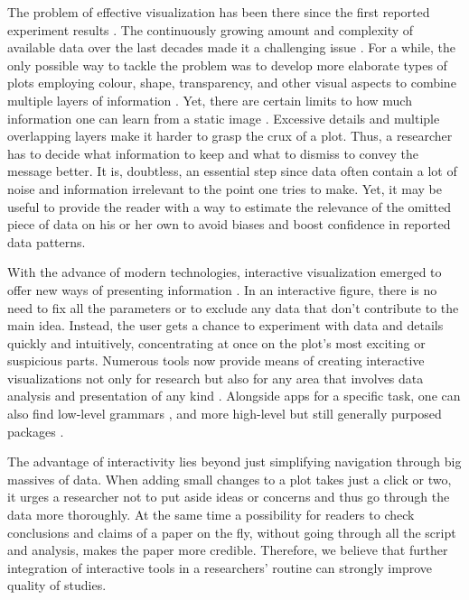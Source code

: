 \documentclass[twocolumn,10pt]{article}
\begin{document}
The problem of effective visualization has been there since the first reported experiment results \citep{friendly_2001}. The continuously growing amount and complexity of available data over the last decades made it a challenging issue \citep{fisher_2017}. For a while, the only possible way to tackle the problem was to develop more elaborate types of plots employing colour, shape, transparency, and other visual aspects to combine multiple layers of information \citep{keahey_2013, bertin_2011, heer_2009}. Yet, there are certain limits to how much information one can learn from a static image \citep{hegarty_2011}. Excessive details and multiple overlapping layers make it harder to grasp the crux of a plot. Thus, a researcher has to decide what information to keep and what to dismiss to convey the message better\citep{odonoghue_2018}. 
It is, doubtless, an essential step since data often contain a lot of noise and information irrelevant to the point one tries to make. Yet, it may be useful to provide the reader with a way to estimate the relevance of the omitted piece of data on his or her own to avoid biases \citep{bresciani_2009} and boost confidence in reported data patterns.

With the advance of modern technologies, interactive visualization emerged to offer new ways of presenting information \citep{newman_1979, becker_1987}. In an interactive figure, there is no need to fix all the parameters or to exclude any data that don't contribute to the main idea. Instead, the user gets a chance to experiment with data and details quickly and intuitively, concentrating at once on the plot's most exciting or suspicious parts. Numerous tools \citep{caldarola_2017} now provide means of creating interactive visualizations not only for research \citep{noronha_2017, wick_2015, hillje_2020, broman_2015} but also for any area that involves data analysis and presentation of any kind \citep{zhao_2012, wu_2010}. Alongside apps for a specific task, one can also find low-level grammars \citep{bostock_2011, satyanarayan_2015}, and more high-level but still generally purposed packages \citep{satyanarayan_2016, shiny, p_2019, sievert_2019}.

The advantage of interactivity lies beyond just simplifying navigation through big massives of data. When adding small changes to a plot takes just a click or two, it urges a researcher not to put aside ideas or concerns and thus go through the data more thoroughly. At the same time a possibility for readers to check conclusions and claims of a paper on the fly, without going through all the script and analysis, makes the paper more credible. Therefore, we believe that further integration of interactive tools in a researchers' routine can strongly improve quality of studies.
\end{document}
